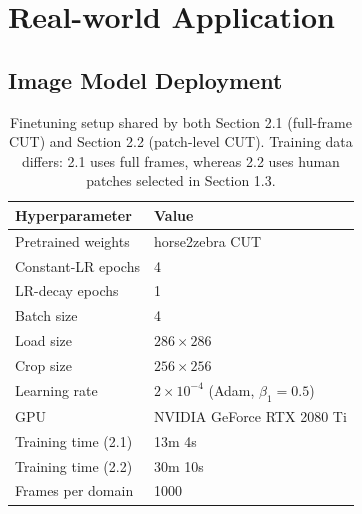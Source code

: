 \section{Real-world Application}\label{s:rwa}


\subsection{Image Model Deployment}

\begin{table}[h]
  \centering
  \caption{Finetuning setup shared by both Section 2.1 (full-frame CUT) and Section 2.2 (patch-level CUT). Training data differs: 2.1 uses full frames, whereas 2.2 uses human patches selected in Section 1.3.}
  \label{tab:setup}
  \small
  \begin{tabular}{ll}
    \toprule
    Hyperparameter & Value \\
    \midrule
    Pretrained weights   & horse2zebra CUT~\cite{park2020cut} \\
    Constant-LR epochs   & 4 \\
    LR-decay epochs      & 1 \\
    Batch size           & 4 \\
    Load size            & $286 \times 286$ \\
    Crop size            & $256 \times 256$ \\
    Learning rate        & $2 \times 10^{-4}$ (Adam, $\beta_1=0.5$) \\
    GPU                  & NVIDIA GeForce RTX 2080 Ti \\
    Training time (2.1)  & 13m 4s \\
    Training time (2.2)  & 30m 10s \\
    Frames per domain    & 1000 \\
    \bottomrule
  \end{tabular}
\end{table}

